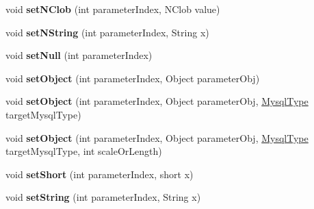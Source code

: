 \begin{DoxyCompactItemize}
void {\bfseries set\+N\+Clob} (int parameter\+Index, N\+Clob value)
\item 
\mbox{\label{interfacecom_1_1mysql_1_1cj_1_1_query_bindings_a126970d505b9183745100c3daa909e5f}} 
void {\bfseries set\+N\+String} (int parameter\+Index, String x)
\item 
\mbox{\label{interfacecom_1_1mysql_1_1cj_1_1_query_bindings_af1a5be4b4810642f2b13d0123e427161}} 
void {\bfseries set\+Null} (int parameter\+Index)
\item 
\mbox{\label{interfacecom_1_1mysql_1_1cj_1_1_query_bindings_a59506654eef36f22e6852427e623b605}} 
void {\bfseries set\+Object} (int parameter\+Index, Object parameter\+Obj)
\item 
\mbox{\label{interfacecom_1_1mysql_1_1cj_1_1_query_bindings_a32037607b59f8c4a04eb3051763d0f9a}} 
void {\bfseries set\+Object} (int parameter\+Index, Object parameter\+Obj, \mbox{\hyperlink{enumcom_1_1mysql_1_1cj_1_1_mysql_type}{Mysql\+Type}} target\+Mysql\+Type)
\item 
\mbox{\label{interfacecom_1_1mysql_1_1cj_1_1_query_bindings_a41fd893683bfdd90551e4d9726fca0ff}} 
void {\bfseries set\+Object} (int parameter\+Index, Object parameter\+Obj, \mbox{\hyperlink{enumcom_1_1mysql_1_1cj_1_1_mysql_type}{Mysql\+Type}} target\+Mysql\+Type, int scale\+Or\+Length)
\item 
\mbox{\label{interfacecom_1_1mysql_1_1cj_1_1_query_bindings_afcbad5dc3cea800a90ee9d5a42b5dc7d}} 
void {\bfseries set\+Short} (int parameter\+Index, short x)
\item 
\mbox{\label{interfacecom_1_1mysql_1_1cj_1_1_query_bindings_a2a505128503e8f5a305d3a169eaad991}} 
void {\bfseries set\+String} (int parameter\+Index, String x)
\item 
\mbox{\label{interfacecom_1_1mysql_1_1cj_1_1_query_bindings_ad6cc1af81e4a8dd64347af71b027b559}} 

\end{DoxyCompactItemize}
